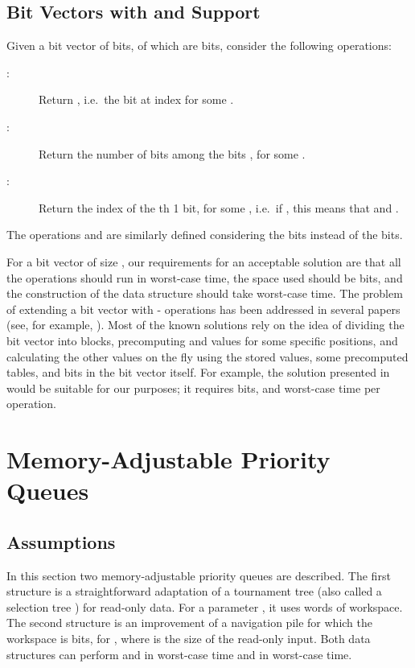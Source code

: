 \documentclass[final,onetabnum,onefignum,onethmnum]{siamltex}
\newcommand{\Minimum}{\mbox{}}
\newcommand{\Insert}{\mbox{}}
\newcommand{\Extract}{\mbox{}}
\newcommand{\Rank}{\mbox{}}
\newcommand{\Select}{\mbox{}}
\begin{document}
\subsection{Bit Vectors with \Rank{} and \Select{} Support}
Given a bit vector  of  bits, of which  are  bits, consider the
following operations:

\begin{description}
\item[:] Return , i.e.~the bit at index  for
  some .
\item[:] Return the number of  bits among the bits
  , for some .
\item[:] Return the index of the th 1 bit, for some , i.e.~if
  , this means that  and . 
\end{description}
The operations  and  are
similarly defined considering the  bits instead of the  bits.

For a bit vector of size , our requirements for an acceptable
solution are that all the operations should run in
 worst-case time, the space used should be  bits,
and the construction of the data structure should take 
worst-case time.  The problem of extending a bit vector with
\Rank{}-\Select{} operations has been addressed in several papers
(see, for example, \cite{Jac89,Mun96,RRR07}).  Most of the known
solutions rely on the idea of dividing the bit vector into blocks,
precomputing \Rank{} and \Select{} values for some specific
positions, and calculating the other values on the fly using the
stored values, some precomputed tables, and bits in the bit vector
itself.  For example, the solution presented in \cite{RRR07} would be
suitable for our purposes; it requires 
bits, and  worst-case time per operation.

\section{Memory-Adjustable Priority Queues}
\label{sec:priority-queues}

\subsection{Assumptions}
In this section two memory-adjustable priority queues are described.
The first structure is a straightforward adaptation of a tournament tree
(also called a selection tree \cite[Section 5.4.1]{Knu73}) for
read-only data. For a parameter , it uses  words of workspace. 
The second structure is an improvement of a navigation pile \cite{KV03} for which 
the workspace is  bits, for , where  is the size of the 
read-only input. Both data structures can perform \Minimum{} and \Insert{} 
in  worst-case time and \Extract{} in  worst-case time.
\end{document}

